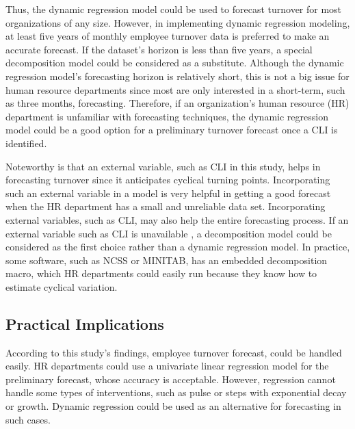 Thus, the dynamic regression model could be used to forecast turnover for most organizations of any size. However, in implementing dynamic regression modeling, at least five years of monthly employee turnover data is preferred to make an accurate forecast. If the dataset's horizon is less than five years, a special decomposition model \citep{ittig1997} could be considered as a substitute. Although the dynamic regression model's forecasting horizon is relatively short, this is not a big issue for human resource departments since most are only interested in a short-term, such as three months, forecasting. Therefore, if an organization's human resource (HR) department is unfamiliar  with forecasting techniques, the dynamic regression model could be a good option for a preliminary turnover forecast once a CLI is identified. 

Noteworthy is that an external variable, such as CLI in this study, helps in forecasting turnover since it anticipates cyclical turning points. Incorporating such an external variable in a model is very helpful in getting a good forecast when the HR department has a small and unreliable data set. Incorporating external variables, such as CLI, may also help the entire forecasting process. If an external variable such as CLI is unavailable , a decomposition model could be considered as the first choice rather than a dynamic regression model. In practice, some software, such as NCSS or MINITAB, has an embedded decomposition macro, which HR departments could easily run because they know how to estimate cyclical variation.
\subsection{Practical Implications}
According to this study's findings, employee turnover forecast, could be handled easily. HR departments could use a univariate linear regression model for the preliminary forecast, whose accuracy is acceptable. However, regression cannot handle some types of interventions, such as pulse or steps with exponential decay or growth. Dynamic regression could   be used as an alternative for forecasting in such cases.


